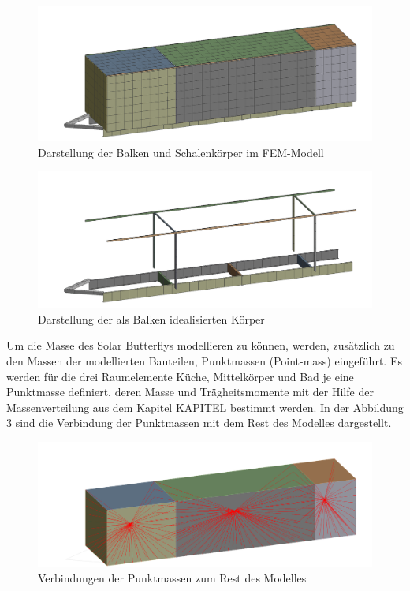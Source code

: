 \begin{figure}[ht!]
  \centering
  \centering
  \includegraphics[width=.7\linewidth]{04_figures/FEM Mesh1.png}
  \caption{Darstellung der Balken und Schalenkörper im FEM-Modell}
  \label{FEM Mesh1}
\end{figure}
\begin{figure}[ht!]
  \centering
  \includegraphics[width=.7\linewidth]{04_figures/FEM Mesh3.png}
  \caption{Darstellung der als Balken idealisierten Körper}
  \label{FEM Mesh3}
\end{figure}

Um die Masse des Solar Butterflys modellieren zu können, werden, zusätzlich zu den Massen der modellierten Bauteilen, Punktmassen (Point-mass) eingeführt. Es werden für die drei Raumelemente Küche, Mittelkörper und Bad je eine Punktmasse definiert, deren Masse und Trägheitsmomente mit der Hilfe der Massenverteilung aus dem Kapitel KAPITEL bestimmt werden. In der Abbildung \ref{img:FEM Punktmasse} sind die Verbindung der Punktmassen mit dem Rest des Modelles dargestellt.\\
\begin{figure}[h]
  \centering
  \includegraphics[width=0.7\linewidth]{04_Figures/FEM Punktmasse.png}
  \caption{Verbindungen der Punktmassen zum Rest des Modelles}
  \label{img:FEM Punktmasse}
\end{figure}

